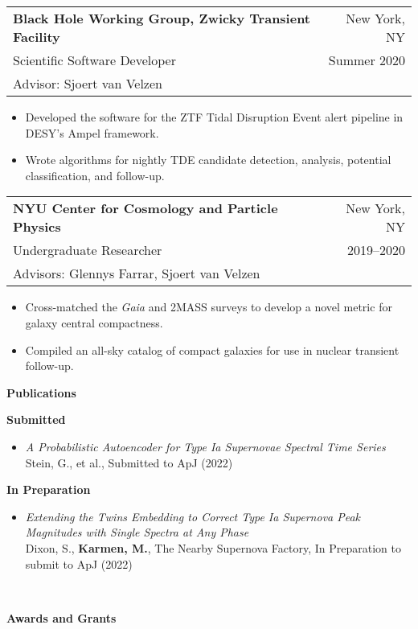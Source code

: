 \documentclass[letterpaper,10pt]{article}
\makeatletter
\newcounter{descounter}
\newcommand{\resetcounter}[0]{\setcounter{descounter}{0}}
\newcommand{\resitem}[1]{\item #1 \vspace{-6pt}}
\newcommand{\resheading}[1]{\resetcounter \vspace{15pt} {\Large \textbf{#1}} \\ \vspace{-8pt}
    \hrulefill\vspace{5pt}}
\newcommand{\ressubheading}[5]{
    \vspace{10pt}
    \begin{tabular*}{7.0in}{l@{\extracolsep{\fill}}r}
        \textbf{#1} & #2 \\
        #3 & #4 \\
        #5 & \\
    \end{tabular*}\vspace{-5pt}
}
\newcommand{\descheader}[1]{\textbf{#1}}
\makeatother
\begin{document}
    \ressubheading{Black Hole Working Group, Zwicky Transient Facility}{New York, NY}{Scientific Software Developer}{Summer 2020}{Advisor: Sjoert van Velzen}

        \begin{itemize}
                \resitem{Developed the software for the ZTF Tidal Disruption Event alert pipeline in DESY's Ampel framework.}
                \resitem{Wrote algorithms for nightly TDE candidate detection, analysis, potential classification, and follow-up.}
        \end{itemize}

    \ressubheading{NYU Center for Cosmology and Particle Physics}{New York, NY}{Undergraduate Researcher}{2019--2020}{Advisors: Glennys Farrar, Sjoert van Velzen}

        \begin{itemize}
                \resitem{Cross-matched the \textit{Gaia} and 2MASS surveys to develop a novel metric for galaxy central compactness.}
                \resitem{Compiled an all-sky catalog of compact galaxies for use in nuclear transient follow-up.}
        \end{itemize}

\resheading{Publications}

\descheader{Submitted}

\begin{itemize}
        \item{ \textit{A Probabilistic Autoencoder for Type Ia Supernovae Spectral Time Series} \\Stein, G., et al., Submitted to ApJ (2022) }

\end{itemize}

\descheader{In Preparation}

    \begin{itemize}

        \item{ \textit{Extending the Twins Embedding to Correct Type Ia Supernova Peak Magnitudes with Single Spectra at Any Phase} \\ Dixon, S., \textbf{Karmen, M.}, The Nearby Supernova Factory, In Preparation to submit to ApJ (2022) }
        \vspace{-5pt}

    \end{itemize}

\resheading{}

\resheading{Awards and Grants}
\end{document}
